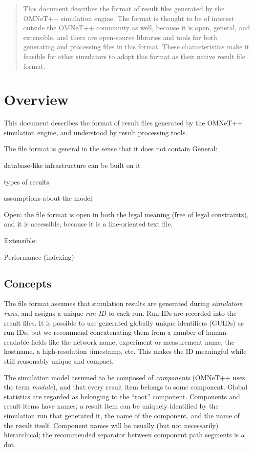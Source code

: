 \begin{abstract} This document describes the format of result files
generated by the OMNeT++ simulation engine. The format is thought to be of
interest outside the OMNeT++ community as well, because it is open,
general, and extensible, and there are open-source libraries and tools for
both generating and processing files in this format. These characteristics
make it feasible for other simulators to adopt this format as their native
result file format. \end{abstract}

\section{Overview}

This document describes the format of result files generated by the OMNeT++
simulation engine, and understood by result processing tools.

The file format is general in the sense that it does not contain General:

database-like infrastructure can be built on it

types of results

assumptions about the model

Open: the file format is open in both the legal meaning (free of legal
constraints), and it is accessible, because it is a line-oriented text
file.

Extensible:

Performance (indexing)

\subsection{Concepts}

The file format assumes that simulation results are generated during
\textit{simulation runs}, and assigns a unique \textit{run ID} to each run.
Run IDs are recorded into the result files. It is possible to use generated
globally unique identifiers (GUIDs) as run IDs, but we recommend
concatenating them from a number of human-readable fields like the network
name, experiment or measurement name, the hostname, a high-resolution timestamp, etc.
This makes the ID meaningful while still reasonably unique and compact.

The simulation model assumed to be composed of \textit{components} (OMNeT++
uses the term \textit{module}), and that every result item belongs to some
component. Global statistics are regarded as belonging to the ``root''
component. Components and result items have names; a result item can be
uniquely identified by the simulation run that generated it, the name of
the component, and the name of the result itself. Component names will be
usually (but not necessarily) hierarchical; the recommended separator
between component path segments is a dot.


